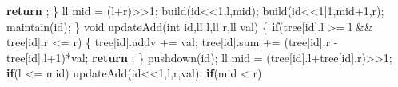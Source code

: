 \documentclass[
]{article}
\newenvironment{Shaded}{}{}
\newcommand{\ControlFlowTok}[1]{\textcolor[rgb]{0.00,0.44,0.13}{\textbf{#1}}}
\newcommand{\DataTypeTok}[1]{\textcolor[rgb]{0.56,0.13,0.00}{#1}}
\newcommand{\DecValTok}[1]{\textcolor[rgb]{0.25,0.63,0.44}{#1}}
\newcommand{\NormalTok}[1]{#1}
\newcommand{\OperatorTok}[1]{\textcolor[rgb]{0.40,0.40,0.40}{#1}}
\begin{document}
\begin{Shaded}
\begin{Highlighting}[]
        \ControlFlowTok{return} \OperatorTok{;}  
    \OperatorTok{\}}  
\NormalTok{    ll mid }\OperatorTok{=} \OperatorTok{(}\NormalTok{l}\OperatorTok{+}\NormalTok{r}\OperatorTok{)\textgreater{}\textgreater{}}\DecValTok{1}\OperatorTok{;}  
\NormalTok{    build}\OperatorTok{(}\NormalTok{id}\OperatorTok{\textless{}\textless{}}\DecValTok{1}\OperatorTok{,}\NormalTok{l}\OperatorTok{,}\NormalTok{mid}\OperatorTok{);}  
\NormalTok{    build}\OperatorTok{(}\NormalTok{id}\OperatorTok{\textless{}\textless{}}\DecValTok{1}\OperatorTok{|}\DecValTok{1}\OperatorTok{,}\NormalTok{mid}\OperatorTok{+}\DecValTok{1}\OperatorTok{,}\NormalTok{r}\OperatorTok{);}  
\NormalTok{    maintain}\OperatorTok{(}\NormalTok{id}\OperatorTok{);}  
\OperatorTok{\}}  
\DataTypeTok{void}\NormalTok{ updateAdd}\OperatorTok{(}\DataTypeTok{int}\NormalTok{ id}\OperatorTok{,}\NormalTok{ll l}\OperatorTok{,}\NormalTok{ll r}\OperatorTok{,}\NormalTok{ll val}\OperatorTok{)} \OperatorTok{\{}  
    \ControlFlowTok{if}\OperatorTok{(}\NormalTok{tree}\OperatorTok{[}\NormalTok{id}\OperatorTok{].}\NormalTok{l }\OperatorTok{\textgreater{}=}\NormalTok{ l }\OperatorTok{\&\&}\NormalTok{ tree}\OperatorTok{[}\NormalTok{id}\OperatorTok{].}\NormalTok{r }\OperatorTok{\textless{}=}\NormalTok{ r}\OperatorTok{)}  
    \OperatorTok{\{}  
\NormalTok{        tree}\OperatorTok{[}\NormalTok{id}\OperatorTok{].}\NormalTok{addv }\OperatorTok{+=}\NormalTok{ val}\OperatorTok{;}  
\NormalTok{        tree}\OperatorTok{[}\NormalTok{id}\OperatorTok{].}\NormalTok{sum }\OperatorTok{+=} \OperatorTok{(}\NormalTok{tree}\OperatorTok{[}\NormalTok{id}\OperatorTok{].}\NormalTok{r }\OperatorTok{{-}}\NormalTok{ tree}\OperatorTok{[}\NormalTok{id}\OperatorTok{].}\NormalTok{l}\OperatorTok{+}\DecValTok{1}\OperatorTok{)*}\NormalTok{val}\OperatorTok{;}  
        \ControlFlowTok{return} \OperatorTok{;}  
    \OperatorTok{\}}  
\NormalTok{    pushdown}\OperatorTok{(}\NormalTok{id}\OperatorTok{);}  
\NormalTok{    ll mid }\OperatorTok{=} \OperatorTok{(}\NormalTok{tree}\OperatorTok{[}\NormalTok{id}\OperatorTok{].}\NormalTok{l}\OperatorTok{+}\NormalTok{tree}\OperatorTok{[}\NormalTok{id}\OperatorTok{].}\NormalTok{r}\OperatorTok{)\textgreater{}\textgreater{}}\DecValTok{1}\OperatorTok{;}  
    \ControlFlowTok{if}\OperatorTok{(}\NormalTok{l }\OperatorTok{\textless{}=}\NormalTok{ mid}\OperatorTok{)}  
\NormalTok{        updateAdd}\OperatorTok{(}\NormalTok{id}\OperatorTok{\textless{}\textless{}}\DecValTok{1}\OperatorTok{,}\NormalTok{l}\OperatorTok{,}\NormalTok{r}\OperatorTok{,}\NormalTok{val}\OperatorTok{);}  
    \ControlFlowTok{if}\OperatorTok{(}\NormalTok{mid }\OperatorTok{\textless{}}\NormalTok{ r}\OperatorTok{)}  

\end{Highlighting}
\end{Shaded}
\end{document}
